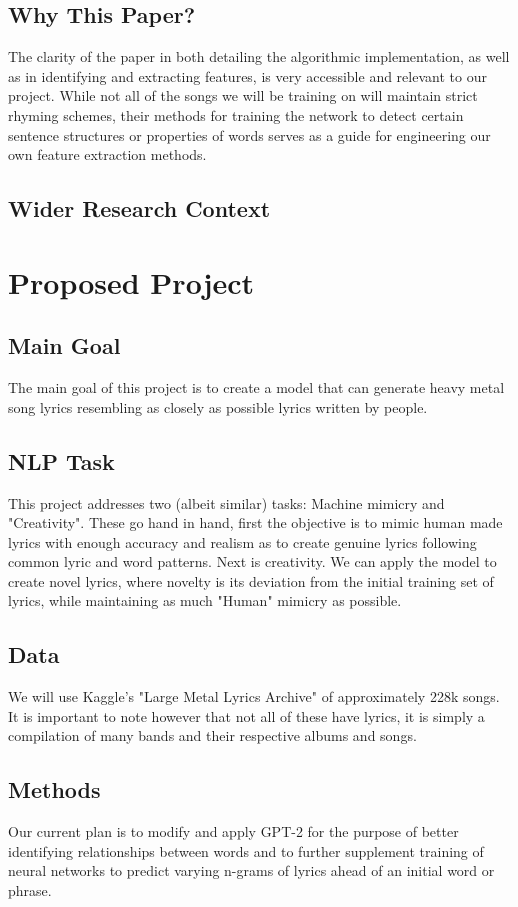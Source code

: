 \documentclass[11pt]{article}
\begin{document}
\subsection{Why This Paper?}
The clarity of the paper in both detailing the algorithmic implementation, as well as in identifying and extracting features, is very accessible and relevant to our project. While not all of the songs we will be training on will maintain strict rhyming schemes, their methods for training the network to detect certain sentence structures or properties of words serves as a guide for engineering our own feature extraction methods.
\subsection{Wider Research Context}


\section{Proposed Project}

\subsection{Main Goal}
The main goal of this project is to create a model that can generate heavy metal song lyrics resembling as closely as possible lyrics written by people.
\subsection{NLP Task} %
This project addresses two (albeit similar) tasks: Machine mimicry and "Creativity". These go hand in hand, first the objective is to mimic human made lyrics with enough accuracy and realism as to create genuine lyrics following common lyric and word patterns. Next is creativity. We can apply the model to create novel lyrics, where novelty is its deviation from the initial training set of lyrics, while maintaining as much "Human" mimicry as possible.
\subsection{Data} %
We will use Kaggle's "Large Metal Lyrics Archive" of approximately 228k songs. It is important to note however that not all of these have lyrics, it is simply a compilation of many bands and their respective albums and songs.
\subsection{Methods} %
Our current plan is to modify and apply GPT-2 for the purpose of better identifying relationships between words and to further supplement training of neural networks to predict varying n-grams of lyrics ahead of an initial word or phrase.
\end{document}
